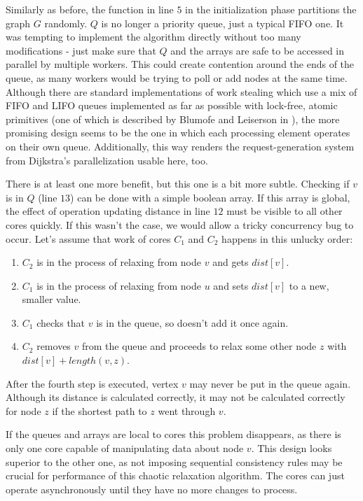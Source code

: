 \documentclass[12pt,a4paper,oneside,openright]{report}
\begin{document}
Similarly as before, the function in line $5$ in the initialization phase partitions the graph $G$ randomly. $Q$ is no longer a priority queue, just a typical FIFO one. It was tempting to implement the algorithm directly without too many modifications - just make sure that $Q$ and the arrays are safe to be accessed in parallel by multiple workers. This could create contention around the ends of the queue, as many workers would be trying to poll or add nodes at the same time. Although there are standard implementations of work stealing which use a mix of FIFO and LIFO queues implemented as far as possible with lock-free, atomic primitives (one of which is described by Blumofe and Leiserson in  \cite{workstealing}), the more promising design seems to be the one in which each processing element operates on their own queue. Additionally, this way renders the  request-generation system from Dijkstra's parallelization usable here, too. 

There is at least one more benefit, but this one is a bit more subtle. Checking if $v$ is in $Q$ (line $13$) can be done with a simple boolean array. If this array is global, the effect of operation updating distance in line $12$ must be visible to all other cores quickly. If this wasn't the case, we would allow a tricky concurrency bug to occur. Let's assume that work of cores $C_1$ and $C_2$ happens in this unlucky order:

\begin{enumerate}
    \item $C_2$ is in the process of relaxing from node $v$ and gets $dist[v]$.
    \item $C_1$ is in the process of relaxing from node $u$ and sets $dist[v]$ to a new, smaller value.
    \item $C_1$ checks that $v$ is in the queue, so doesn't add it once again.
    \item $C_2$ removes $v$ from the queue and proceeds to relax some other node $z$ with $dist[v] + length(v, z)$.
\end{enumerate}
After the fourth step is executed, vertex $v$ may never be put in the queue again. Although its distance is calculated correctly, it may not be calculated correctly for node $z$ if the shortest path to $z$ went through $v$.

If the queues and arrays are local to cores this problem disappears, as there is only one core capable of manipulating data about node $v$. This design looks superior to the other one, as not imposing sequential consistency rules may be crucial for performance of this chaotic relaxation algorithm. The cores can just operate asynchronously until they have no more changes to process.
\end{document}
